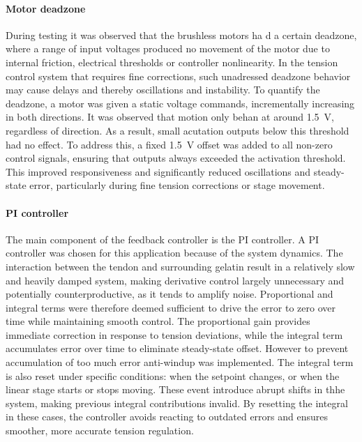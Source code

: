 \paragraph*{Motor deadzone}
During testing it was observed that the brushless motors ha d a certain deadzone, where a range of input voltages produced no movement of the motor due to internal friction, electrical thresholds or controller nonlinearity. In the tension control system that requires fine corrections, such unadressed deadzone behavior may cause delays and thereby oscillations and instability.
\newline \newline 
To quantify the deadzone, a motor was given a static voltage commands, incrementally increasing in both directions. It was observed that motion only behan at around \SI{1.5}{\volt}, regardless of direction. As a result, small acutation outputs below this threshold had no effect.
\newline \newline
To address this, a fixed \SI{1.5}{\volt} offset was added to all non-zero control signals, ensuring that outputs always exceeded the activation threshold. This improved responsiveness and significantly reduced oscillations and steady-state error, particularly during fine tension corrections or stage movement.

\paragraph*{PI controller}
The main component of the feedback controller is the PI controller. A PI controller was chosen for this application because of the system dynamics. The interaction between the tendon and surrounding gelatin result in a relatively slow and heavily damped system, making derivative control largely unnecessary and potentially counterproductive, as it tends to amplify noise. Proportional and integral terms were therefore deemed sufficient to drive the error to zero over time while maintaining smooth control. 
\newline \newline
The proportional gain provides immediate correction in response to tension deviations, while the integral term accumulates error over time to eliminate steady-state offset. However to prevent accumulation of too much error anti-windup was implemented. The integral term is also reset under specific conditions: when the setpoint changes, or when the linear stage starts or stops moving. These event introduce abrupt shifts in thhe system, making previous integral contributions invalid. By resetting the integral in these cases, the controller avoids reacting to outdated errors and ensures smoother, more accurate tension regulation. 

